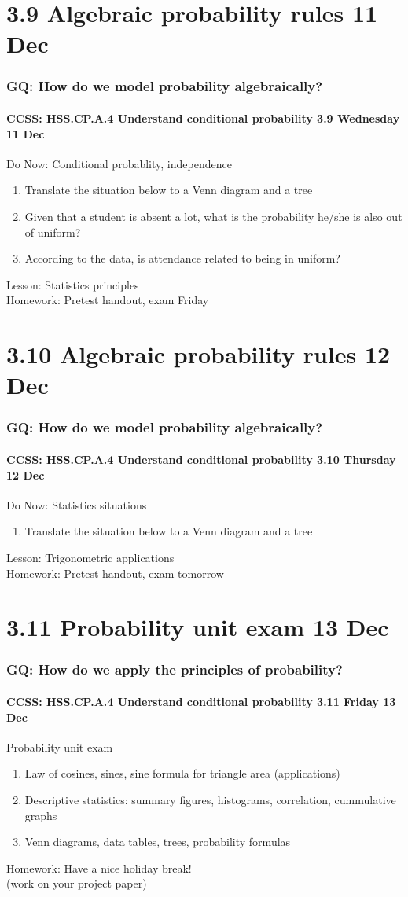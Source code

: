 \documentclass{beamer}
\begin{document}
\section{3.9 Algebraic probability rules 11 Dec}
\frame
{
  \frametitle{GQ: How do we model probability algebraically?}
  \framesubtitle{CCSS: HSS.CP.A.4 Understand conditional probability \hfill \alert{3.9 Wednesday 11 Dec}}

  \begin{block}{Do Now: Conditional probablity, independence}
  \begin{enumerate}
    \item Translate the situation below to a Venn diagram and a tree
    \item Given that a student is absent a lot, what is the probability he/she is also out of uniform?
    \item According to the data, is attendance related to being in uniform?
  \end{enumerate}
  \end{block}
  Lesson: Statistics principles \\ \smallskip
  Homework: Pretest handout, \alert{exam Friday}
}

\section{3.10 Algebraic probability rules 12 Dec}
\frame
{
  \frametitle{GQ: How do we model probability algebraically?}
  \framesubtitle{CCSS: HSS.CP.A.4 Understand conditional probability \hfill \alert{3.10 Thursday 12 Dec}}

  \begin{block}{Do Now: Statistics situations}
  \begin{enumerate}
    \item Translate the situation below to a Venn diagram and a tree
  \end{enumerate}
  \end{block}
  Lesson: Trigonometric applications \\ \smallskip
  Homework: Pretest handout, \alert{exam tomorrow}
}

\section{3.11 Probability unit exam 13 Dec}
\frame
{
  \frametitle{GQ: How do we apply the principles of probability?}
  \framesubtitle{CCSS: HSS.CP.A.4 Understand conditional probability \hfill \alert{3.11 Friday 13 Dec}}

  \begin{block}{Probability unit exam}
  \begin{enumerate}
    \item Law of cosines, sines, sine formula for triangle area (applications)
    \item Descriptive statistics: summary figures, histograms, correlation, cummulative graphs
    \item Venn diagrams, data tables, trees, probability formulas
  \end{enumerate}
  \end{block}
  Homework: Have a nice holiday break! \\(work on your project paper)
}
\end{document}
